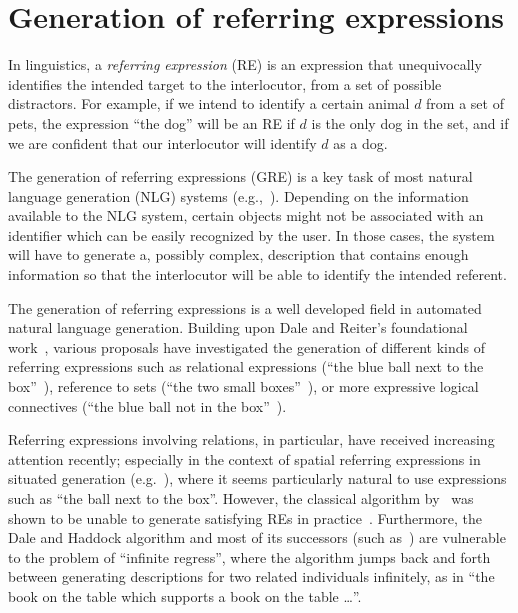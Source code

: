 \section{Generation of referring expressions}\label{sec:gre}

In linguistics, a \emph{referring expression} (RE) is an expression that 
unequivocally identifies the intended target to the interlocutor, from a set of possible distractors.  
For example, if we intend to identify a certain animal $d$ from a set of pets, the expression 
``the dog'' will be an RE if $d$ is the only dog in the set, and if we are confident
that our interlocutor will identify $d$ as a dog. 

The generation of referring expressions (GRE)  is a key task of most natural 
language generation (NLG) systems (e.g.,~\cite[Section 5.4]{dale2000}). 
Depending on the information available to the NLG system, certain objects might 
not be associated with an identifier which can be easily recognized by the user. 
In those cases, the system will have to generate a, possibly complex, description that contains 
enough information so that the interlocutor will be able to identify the intended referent.

The generation of referring expressions is a well developed field in automated natural language generation.
Building upon Dale and Reiter's foundational work~\cite{dale89cooking,Dale1995},
various proposals have investigated the generation of different kinds of referring expressions 
such as relational expressions (``the blue ball next to the box''~\cite{dale91:_gener_refer_expres_invol_relat}),
reference to sets (``the two small boxes''~\cite{Stone2000}), or more expressive logical connectives (``the 
blue ball not in the box''~\cite{deemter02:_gener_refer_expres}).

Referring expressions involving relations, in particular, have
received increasing attention recently; especially in the context of
spatial referring expressions in situated generation (e.g.~\cite{kelleher06:_increm_gener_of_spatial_refer}), where it seems
particularly natural to use expressions such as ``the ball next to the box''.  However, the classical algorithm by~\cite{dale91:_gener_refer_expres_invol_relat} was shown to be unable to generate satisfying REs in practice~\cite{viethen06:_algor_for_gener_refer_expres}.  Furthermore, the Dale
and Haddock algorithm and most of its successors (such as~\cite{kelleher06:_increm_gener_of_spatial_refer}) are vulnerable to
the problem of ``infinite regress'', where the algorithm jumps back
and forth between generating descriptions for two related individuals
infinitely, as in ``the book on the table which supports a book on the
table \ldots''.


